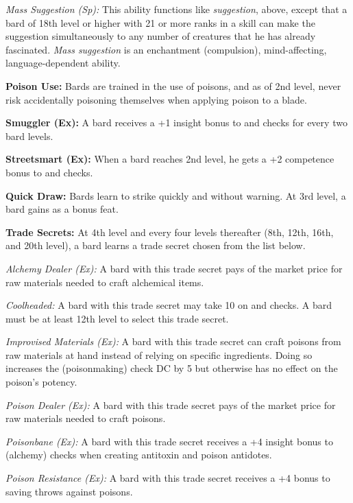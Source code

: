 \textit{Mass Suggestion (Sp):} This ability functions like \emph{suggestion}, above, except that a bard of 18th level or higher with 21 or more ranks in a  skill can make the suggestion simultaneously to any number of creatures that he has already fascinated. \emph{Mass suggestion} is an enchantment (compulsion), mind-affecting, language-dependent ability.

\textbf{Poison Use:} Bards are trained in the use of poisons, and as of 2nd level, never risk accidentally poisoning themselves when applying poison to a blade.

\textbf{Smuggler (Ex):} A bard receives a +1 insight bonus to  and  checks for every two bard levels.

\textbf{Streetsmart (Ex):} When a bard reaches 2nd level, he gets a +2 competence bonus to  and  checks.

\textbf{Quick Draw:} Bards learn to strike quickly and without warning. At 3rd level, a bard gains  as a bonus feat.

\textbf{Trade Secrets:} At 4th level and every four levels thereafter (8th, 12th, 16th, and 20th level), a bard learns a trade secret chosen from the list below.

\textit{Alchemy Dealer (Ex):} A bard with this trade secret pays \onehalf of the market price for raw materials needed to craft alchemical items.

\textit{Coolheaded:} A bard with this trade secret may take 10 on  and  checks. A bard must be at least 12th level to select this trade secret.

\textit{Improvised Materials (Ex):} A bard with this trade secret can craft poisons from raw materials at hand instead of relying on specific ingredients. Doing so increases the  (poisonmaking) check DC by 5 but otherwise has no effect on the poison's potency.

\textit{Poison Dealer (Ex):} A bard with this trade secret pays \onehalf of the market price for raw materials needed to craft poisons.

\textit{Poisonbane (Ex):} A bard with this trade secret receives a +4 insight bonus to  (alchemy) checks when creating antitoxin and poison antidotes.

\textit{Poison Resistance (Ex):} A bard with this trade secret receives a +4 bonus to saving throws against poisons.

